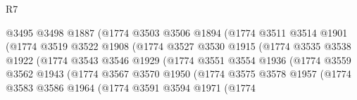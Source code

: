 \begin{lexlean}{R7}
\begin{coremodule}
                                @3495
                                @3498
                                @1887
                                (@1774
                                  @3503
                                  @3506
                                  @1894
                                  (@1774
                                    @3511
                                    @3514
                                    @1901
                                    (@1774
                                      @3519
                                      @3522
                                      @1908
                                      (@1774
                                        @3527
                                        @3530
                                        @1915
                                        (@1774
                                          @3535
                                          @3538
                                          @1922
                                          (@1774
                                            @3543
                                            @3546
                                            @1929
                                            (@1774
                                              @3551
                                              @3554
                                              @1936
                                              (@1774
                                                @3559
                                                @3562
                                                @1943
                                                (@1774
                                                  @3567
                                                  @3570
                                                  @1950
                                                  (@1774
                                                    @3575
                                                    @3578
                                                    @1957
                                                    (@1774
                                                      @3583
                                                      @3586
                                                      @1964
                                                      (@1774
                                                        @3591
                                                        @3594
                                                        @1971
                                                        (@1774

\end{coremodule}
\end{lexlean}
